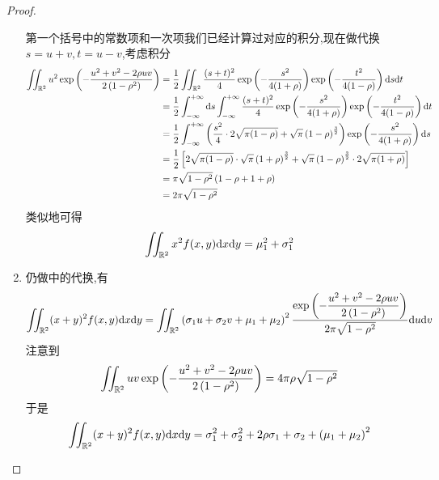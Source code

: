 \documentclass{ctexart}
\begin{document}
\begin{proof}
\begin{enumerate}[label=\tbf{(\arabic*)}]
            第一个括号中的常数项和一次项我们已经计算过对应的积分,现在做代换$s=u+v,t=u-v$,考虑积分
            \[\begin{aligned}
                \iint_{\mathbb{R}^2}u^2\exp\left(-\dfrac{u^2+v^2-2\rho uv}{2\left(1-\rho^2\right)}\right)
                &= \dfrac12\iint_{\mathbb{R}^2}\dfrac{(s+t)^2}{4}\exp\left(-\dfrac{s^2}{4(1+\rho)}\right)\exp\left(-\dfrac{t^2}{4(1-\rho)}\right)\mathrm{d} s\mathrm{d} t \\
                &= \dfrac12\int_{-\infty}^{+\infty}\mathrm{d} s\int_{-\infty}^{+\infty}\dfrac{(s+t)^2}{4}\exp\left(-\dfrac{s^2}{4(1+\rho)}\right)\exp\left(-\dfrac{t^2}{4(1-\rho)}\right)\mathrm{d} t \\
                &= \dfrac12\int_{-\infty}^{+\infty}\left(\dfrac{s^2}{4}\cdot2\sqrt{\pi(1-\rho)}+\sqrt{\pi}\left(1-\rho\right)^{\frac32}\right)\exp\left(-\dfrac{s^2}{4(1+\rho)}\right)\mathrm{d} s \\
                &= \dfrac12\left[2\sqrt{\pi(1-\rho)}\cdot\sqrt{\pi}\left(1+\rho\right)^{\frac32}+\sqrt{\pi}\left(1-\rho\right)^{\frac32}\cdot2\sqrt{\pi(1+\rho)}\right] \\
                &= \pi\sqrt{1-\rho^2}\left(1-\rho+1+\rho\right) \\
                &= 2\pi\sqrt{1-\rho^2}
            \end{aligned}\]
            类似地可得
            \[\iint_{\mathbb{R}^2}x^2f(x,y)\mathrm{d} x\mathrm{d} y=\mu_1^2+\sigma_1^2\]
        \item 仍做中的代换,有
            \[\iint_{\mathbb{R}^2}(x+y)^2f(x,y)\mathrm{d} x\mathrm{d} y=\iint_{\mathbb{R}^2}\left(\sigma_1u+\sigma_2v+\mu_1+\mu_2\right)^2\dfrac{\exp\left(-\dfrac{u^2+v^2-2\rho uv}{2\left(1-\rho^2\right)}\right)}{2\pi\sqrt{1-\rho^2}}\mathrm{d} u\mathrm{d} v\]
            注意到
            \[\iint_{\mathbb{R}^2}uv\exp\left(-\dfrac{u^2+v^2-2\rho uv}{2\left(1-\rho^2\right)}\right)=4\pi\rho\sqrt{1-\rho^2}\]
            于是
            \[\iint_{\mathbb{R}^2}(x+y)^2f(x,y)\mathrm{d} x\mathrm{d} y=\sigma_1^2+\sigma_2^2+2\rho\sigma_1+\sigma_2+\left(\mu_1+\mu_2\right)^2\]
    \end{enumerate}
\end{proof}
\end{document}
